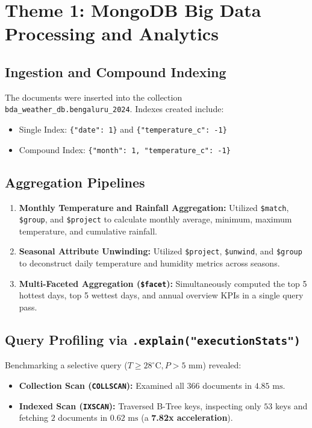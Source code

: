 \documentclass[12pt,a4paper]{article}
\begin{document}
\section{Theme 1: MongoDB Big Data Processing and Analytics}

\subsection{Ingestion and Compound Indexing}
The documents were inserted into the collection \texttt{bda\_weather\_db.bengaluru\_2024}. Indexes created include:
\begin{itemize}
    \item Single Index: \texttt{\{"date": 1\}} and \texttt{\{"temperature\_c": -1\}}
    \item Compound Index: \texttt{\{"month": 1, "temperature\_c": -1\}}
\end{itemize}

\subsection{Aggregation Pipelines}
\begin{enumerate}
    \item \textbf{Monthly Temperature and Rainfall Aggregation:} Utilized \texttt{\$match}, \texttt{\$group}, and \texttt{\$project} to calculate monthly average, minimum, maximum temperature, and cumulative rainfall.
    \item \textbf{Seasonal Attribute Unwinding:} Utilized \texttt{\$project}, \texttt{\$unwind}, and \texttt{\$group} to deconstruct daily temperature and humidity metrics across seasons.
    \item \textbf{Multi-Faceted Aggregation (\texttt{\$facet}):} Simultaneously computed the top 5 hottest days, top 5 wettest days, and annual overview KPIs in a single query pass.
\end{enumerate}

\subsection{Query Profiling via \texttt{.explain("executionStats")}}
Benchmarking a selective query ($T \ge 28^\circ\text{C}, P > 5\text{ mm}$) revealed:
\begin{itemize}
    \item \textbf{Collection Scan (\texttt{COLLSCAN}):} Examined all $366$ documents in $4.85\text{ ms}$.
    \item \textbf{Indexed Scan (\texttt{IXSCAN}):} Traversed B-Tree keys, inspecting only $53$ keys and fetching $2$ documents in $0.62\text{ ms}$ (a \textbf{7.82x acceleration}).
\end{itemize}
\end{document}

